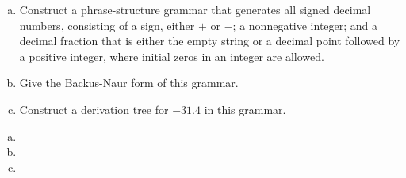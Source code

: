 \documentclass[../main.tex]{subfiles}
\begin{document}
\begin{enumerate}[a)]
	\item Construct a phrase-structure grammar that generates all signed decimal numbers,
		consisting of a sign, either $+$ or $-$;
		a nonnegative integer;
		and a decimal fraction that is either the empty string or a decimal point followed by a positive integer,
		where initial zeros in an integer are allowed.
	\item Give the Backus-Naur form of this grammar.
	\item Construct a derivation tree for $-31.4$ in this grammar.
\end{enumerate}

\solution
\begin{enumerate}[a)]
	\item 
	\item 
	\item 
\end{enumerate}
\end{document}
